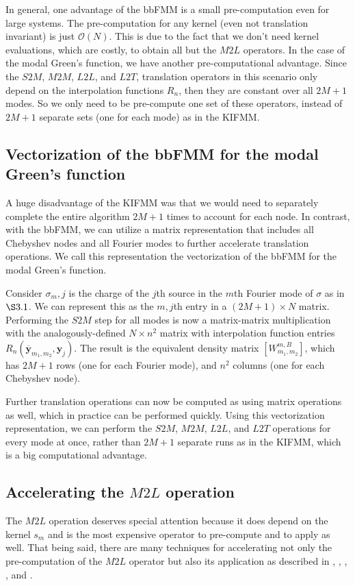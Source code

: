 \documentclass[11pt, oneside]{article}   	%
\begin{document}
In general, one advantage of the bbFMM is a small pre-computation even for large systems. The pre-computation for any kernel (even not translation invariant) is just $\mathcal{O}(N)$. This is due to the fact that we don't need kernel evaluations, which are costly, to obtain all but the $M2L$ operators. In the case of the modal Green's function, we have another pre-computational advantage. Since the $S2M$, $M2M$, $L2L$, and $L2T$, translation operators in this scenario only depend on the interpolation functions $R_n$, then they are constant over all $2M+1$ modes. So we only need to be pre-compute one set of these operators, instead of $2M+1$ separate sets (one for each mode) as in the KIFMM.

\subsection{Vectorization of the bbFMM for the modal Green's function}
A huge disadvantage of the KIFMM was that we would need to separately complete the entire algorithm $2M+1$ times to account for each node. In contrast, with the bbFMM, we can utilize a matrix representation that includes all Chebyshev nodes and all Fourier modes to further accelerate translation operations. We call this representation the vectorization of the bbFMM for the modal Green's function.

Consider $\sigma_m,j$ is the charge of  the $j$th source in the $m$th Fourier mode of $\sigma$ as in $\S3.1$. We can represent this as the $m,j$th entry in a $(2M+1)\times N$ matrix. Performing the $S2M$ step for all modes is now a matrix-matrix multiplication with the analogously-defined $N\times n^2$ matrix with interpolation function entries $R_n(\mathbf{\overline{y}}_{m_1,m_2},\mathbf{y}_j)$. The result is the equivalent density matrix $[W^{m,B}_{m_1,m_2}]$, which has $2M+1$ rows (one for each Fourier mode), and $n^2$ columns (one for each Chebyshev node).

Further translation operations can now be computed as using matrix operations as well, which in practice can be performed quickly. Using this vectorization representation, we can perform the $S2M$, $M2M$, $L2L$, and $L2T$ operations for every mode at once, rather than $2M+1$ separate runs as in the KIFMM, which is a big computational advantage.

\subsection{Accelerating the $M2L$ operation}
The $M2L$ operation deserves special attention because it does depend on the kernel $s_m$ and is the most expensive operator to pre-compute and to apply as well. That being said, there are many techniques for accelerating not only the pre-computation of the $M2L$ operator but also its application as described in \cite{A}, \cite{CGMR}, \cite{FD}, \cite{MR}, and \cite{VBT}.
\end{document}
